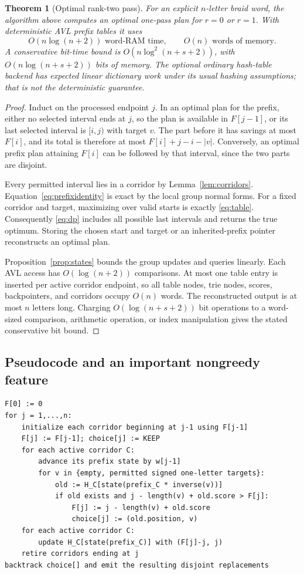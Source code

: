 \documentclass[11pt]{article}
\newtheorem{theorem}{Theorem}[section]
\theoremstyle{definition}
\theoremstyle{remark}
\begin{document}
\begin{theorem}[Optimal rank-two pass]\label{thm:optimal}
For an explicit $n$-letter braid word, the algorithm above computes an
optimal one-pass plan for $r=0$ or $r=1$. With deterministic AVL prefix tables
it uses
\[
 O(n\log(n+2))\text{ word-RAM time},\qquad O(n)\text{ words of memory}.
\]
A conservative bit-time bound is $O(n\log^2(n+s+2))$, with
$O(n\log(n+s+2))$ bits of memory. The optional ordinary hash-table backend
has expected linear dictionary work under its usual hashing assumptions;
that is not the deterministic guarantee.
\end{theorem}
\begin{proof}
Induct on the processed endpoint $j$. In an optimal plan for the prefix,
either no selected interval ends at $j$, so the plan is available in
$F[j-1]$, or its last selected interval is $[i,j)$ with target $v$. The part
before it has savings at most $F[i]$, and its total is therefore at most
$F[i]+j-i-|v|$. Conversely, an optimal prefix plan attaining $F[i]$ can be
followed by that interval, since the two parts are disjoint.

Every permitted interval lies in a corridor by Lemma~\ref{lem:corridors}.
Equation~\eqref{eq:prefixidentity} is exact by the local group normal forms.
For a fixed corridor and target, maximizing over valid starts is exactly
\eqref{eq:table}. Consequently \eqref{eq:dp} includes all possible last
intervals and returns the true optimum. Storing the chosen start and target
or an inherited-prefix pointer reconstructs an optimal plan.

Proposition~\ref{prop:states} bounds the group updates and queries linearly.
Each AVL access has $O(\log(n+2))$ comparisons. At most one table entry is
inserted per active corridor endpoint, so all table nodes, trie nodes,
scores, backpointers, and corridors occupy $O(n)$ words. The reconstructed
output is at most $n$ letters long. Charging $O(\log(n+s+2))$ bit operations
to a word-sized comparison, arithmetic operation, or index manipulation
gives the stated conservative bit bound.
\end{proof}

\subsection{Pseudocode and an important nongreedy feature}
\begin{lstlisting}[caption={Optimal disjoint shortening; exact group states are implicit.}]
F[0] := 0
for j = 1,...,n:
    initialize each corridor beginning at j-1 using F[j-1]
    F[j] := F[j-1]; choice[j] := KEEP
    for each active corridor C:
        advance its prefix state by w[j-1]
        for v in {empty, permitted signed one-letter targets}:
            old := H_C[state(prefix_C * inverse(v))]
            if old exists and j - length(v) + old.score > F[j]:
                F[j] := j - length(v) + old.score
                choice[j] := (old.position, v)
    for each active corridor C:
        update H_C[state(prefix_C)] with (F[j]-j, j)
    retire corridors ending at j
backtrack choice[] and emit the resulting disjoint replacements
\end{lstlisting}
\end{document}
